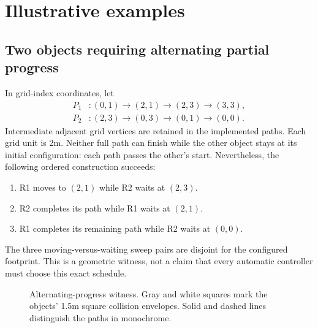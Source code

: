 \documentclass[11pt,a4paper]{article}
\theoremstyle{remark}
\begin{document}
\section{Illustrative examples}

\subsection{Two objects requiring alternating partial progress}
In grid-index coordinates, let
\begin{align}
 P_1 &: (0,1)\to(2,1)\to(2,3)\to(3,3),\nonumber\\
 P_2 &: (2,3)\to(0,3)\to(0,1)\to(0,0).
 \label{eq:alternating}
\end{align}
Intermediate adjacent grid vertices are retained in the implemented paths.
Each grid unit is 2m. Neither full path can finish while the other object
stays at its initial configuration: each path passes the other's start.
Nevertheless, the following ordered construction succeeds:
\begin{enumerate}
\item R1 moves to $(2,1)$ while R2 waits at $(2,3)$.
\item R2 completes its path while R1 waits at $(2,1)$.
\item R1 completes its remaining path while R2 waits at $(0,0)$.
\end{enumerate}
The three moving-versus-waiting sweep pairs are disjoint for the configured
footprint. This is a geometric witness, not a claim that every automatic
controller must choose this exact schedule.

\begin{figure}[htbp]
\centering
{}
\caption{Alternating-progress witness. Gray and white squares mark the
objects' 1.5m square collision envelopes. Solid and dashed lines distinguish
the paths in monochrome.}
\label{fig:alternating}
\end{figure}
\end{document}
